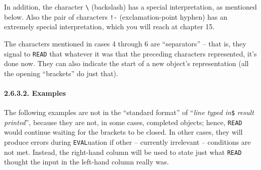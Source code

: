 \documentclass[a4paper,]{article}
\let\oldparagraph\paragraph
\renewcommand{\paragraph}[1]{\oldparagraph{#1}\mbox{}}
\begin{document}
In addition, the character \texttt{\textbackslash{}} (backslash) has a special interpretation, as mentioned below. Also the
pair of characters \texttt{!-} (exclamation-point hyphen) has an extremely special interpretation, which you will reach at
chapter 15.

The characters mentioned in cases 4 through 6 are ``separators'' -- that is, they signal to \texttt{READ} that whatever it
was that the preceding characters represented, it's done now. They can also indicate the start of a new object's
representation (all the opening ``brackets'' do just that).

\paragraph{2.6.3.2. Examples}\label{examples}

The following examples are not in the ``standard format'' of ``\emph{line typed in}\texttt{\$} \emph{result printed}'',
because they are not, in some cases, completed objects; hence, \texttt{READ} would continue waiting for the brackets to be
closed. In other cases, they will produce errors during \texttt{EVAL}uation if other -- currently irrelevant -- conditions
are not met. Instead, the right-hand column will be used to state just what \texttt{READ} thought the input in the
left-hand column really was.
\end{document}
